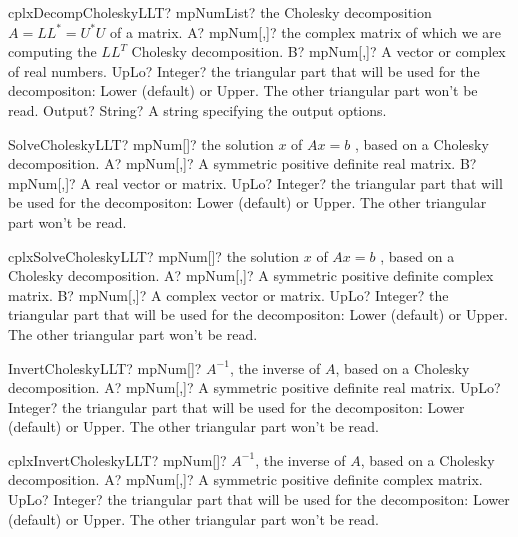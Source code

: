 \documentclass[12pt,a4paper,openany]{book}
\begin{document}
\begin{mpFunctionsExtract}
\mpFunctionFour
{cplxDecompCholeskyLLT? mpNumList? the Cholesky decomposition $A = LL^* = U^*U$ of a matrix.}
{A? mpNum[,]? the complex matrix of which we are computing the $LL^T$ Cholesky decomposition.}
{B? mpNum[,]? A vector or complex of real numbers.}
{UpLo? Integer? the triangular part that will be used for the decompositon: Lower (default) or Upper. The other triangular part won't be read.}
{Output? String? A string specifying the output options.}
\end{mpFunctionsExtract}

\begin{mpFunctionsExtract}
\mpFunctionThree
{SolveCholeskyLLT? mpNum[]? the solution $x$ of $A x = b$ , based on a Cholesky decomposition.}
{A? mpNum[,]? A symmetric positive definite real matrix.}
{B? mpNum[,]? A real vector or matrix.}
{UpLo? Integer? the triangular part that will be used for the decompositon: Lower (default) or Upper. The other triangular part won't be read.}
\end{mpFunctionsExtract}

\begin{mpFunctionsExtract}
\mpFunctionThree
{cplxSolveCholeskyLLT? mpNum[]? the solution $x$ of $A x = b$ , based on a Cholesky decomposition.}
{A? mpNum[,]? A symmetric positive definite complex matrix.}
{B? mpNum[,]? A complex vector or matrix.}
{UpLo? Integer? the triangular part that will be used for the decompositon: Lower (default) or Upper. The other triangular part won't be read.}
\end{mpFunctionsExtract}

\begin{mpFunctionsExtract}
\mpFunctionTwo
{InvertCholeskyLLT? mpNum[]? $A^{-1}$, the inverse of $A$, based on a Cholesky decomposition.}
{A? mpNum[,]? A symmetric positive definite real matrix.}
{UpLo? Integer? the triangular part that will be used for the decompositon: Lower (default) or Upper. The other triangular part won't be read.}
\end{mpFunctionsExtract}

\begin{mpFunctionsExtract}
\mpFunctionTwo
{cplxInvertCholeskyLLT? mpNum[]? $A^{-1}$, the inverse of $A$, based on a Cholesky decomposition.}
{A? mpNum[,]? A symmetric positive definite complex matrix.}
{UpLo? Integer? the triangular part that will be used for the decompositon: Lower (default) or Upper. The other triangular part won't be read.}
\end{mpFunctionsExtract}
\end{document}
